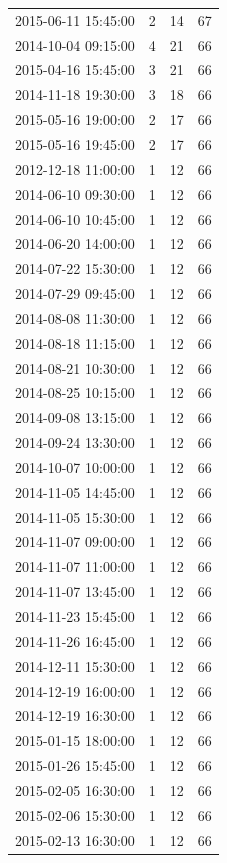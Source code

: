\begin{tabular}{lrrr}
2015-06-11 15:45:00 & 2 & 14 & 67 \\
2014-10-04 09:15:00 & 4 & 21 & 66 \\
2015-04-16 15:45:00 & 3 & 21 & 66 \\
2014-11-18 19:30:00 & 3 & 18 & 66 \\
2015-05-16 19:00:00 & 2 & 17 & 66 \\
2015-05-16 19:45:00 & 2 & 17 & 66 \\
2012-12-18 11:00:00 & 1 & 12 & 66 \\
2014-06-10 09:30:00 & 1 & 12 & 66 \\
2014-06-10 10:45:00 & 1 & 12 & 66 \\
2014-06-20 14:00:00 & 1 & 12 & 66 \\
2014-07-22 15:30:00 & 1 & 12 & 66 \\
2014-07-29 09:45:00 & 1 & 12 & 66 \\
2014-08-08 11:30:00 & 1 & 12 & 66 \\
2014-08-18 11:15:00 & 1 & 12 & 66 \\
2014-08-21 10:30:00 & 1 & 12 & 66 \\
2014-08-25 10:15:00 & 1 & 12 & 66 \\
2014-09-08 13:15:00 & 1 & 12 & 66 \\
2014-09-24 13:30:00 & 1 & 12 & 66 \\
2014-10-07 10:00:00 & 1 & 12 & 66 \\
2014-11-05 14:45:00 & 1 & 12 & 66 \\
2014-11-05 15:30:00 & 1 & 12 & 66 \\
2014-11-07 09:00:00 & 1 & 12 & 66 \\
2014-11-07 11:00:00 & 1 & 12 & 66 \\
2014-11-07 13:45:00 & 1 & 12 & 66 \\
2014-11-23 15:45:00 & 1 & 12 & 66 \\
2014-11-26 16:45:00 & 1 & 12 & 66 \\
2014-12-11 15:30:00 & 1 & 12 & 66 \\
2014-12-19 16:00:00 & 1 & 12 & 66 \\
2014-12-19 16:30:00 & 1 & 12 & 66 \\
2015-01-15 18:00:00 & 1 & 12 & 66 \\
2015-01-26 15:45:00 & 1 & 12 & 66 \\
2015-02-05 16:30:00 & 1 & 12 & 66 \\
2015-02-06 15:30:00 & 1 & 12 & 66 \\
2015-02-13 16:30:00 & 1 & 12 & 66 \\

\end{tabular}
